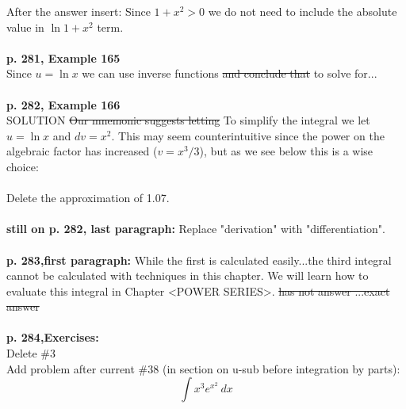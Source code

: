 \documentclass[11pt]{report}
\begin{document}
After the answer insert: Since $1 + x^2 > 0$ we do not need to include the absolute value in $\ln 1+x^2$ term.\\ \\  

\textbf{p. 281, Example 165}\\
Since $u = \ln x$ we can use inverse functions \sout{and conclude that} to solve for...\\ \\

\textbf{p. 282, Example 166}\\
SOLUTION \sout{Our mnemonic suggests letting} To simplify the integral we let $u = \ln x$ and $dv = x^2$. This may seem counterintuitive since the power on the algebraic factor has increased ($v=x^3/3$), but as we see below this is a wise choice:\\ \\

Delete the approximation of 1.07.\\ \\

\textbf{still on p. 282, last paragraph:} Replace "derivation" with "differentiation". \\ \\

\textbf{p. 283,first paragraph:} While the first is calculated easily...the third integral cannot be calculated with techniques in this chapter. We will learn how to evaluate this integral in Chapter <POWER SERIES>. \sout{has not answer ...exact answer}\\ \\

\textbf{p. 284,Exercises:}\\
Delete \#3\\

Add problem after current \#38 (in section on u-sub before integration by parts):
$$\int x^3 e^{x^2}~dx$$
\end{document}
